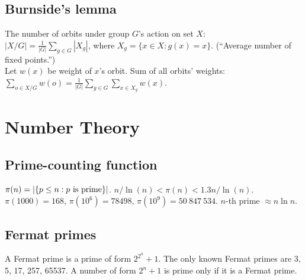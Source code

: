 \documentclass[12pt]{extarticle}
\begin{document}
\begin{multicols*}{2}
\subsection{Burnside's lemma}
The number of orbits under group $G$'s action on set $X$:\\
$|X/G| = \frac{1}{|G|} \sum_{g \in G} |X_g|$,
where $X_g=\{ x \in X: g(x)=x \}$. (``Average number of fixed points.'') \\
Let $w(x)$ be weight of $x$'s orbit. Sum of all orbits' weights:
$\sum_{o \in X/G} w(o) = \frac{1}{|G|} \sum_{g \in G} \sum_{x \in X_g} w(x)$.




\section{Number Theory}


\subsection{Prime-counting function} $\pi(n) = |\{p \le n : p \hbox{ is prime}\}|$.
$n/\ln(n) < \pi(n) < 1.3 n/\ln(n)$.
$\pi(1000) = 168$, $\pi(10^6) = 78498$, $\pi(10^9) = 50\ 847\ 534$.
\quad $n$-th prime $\approx n \ln n$.

\subsection{Fermat primes}  A Fermat prime is a prime of form $2^{2^n}+1$.
The only known Fermat primes are 3, 5, 17, 257, 65537.
A number of form $2^n+1$ is prime only if it is a Fermat prime.



\end{multicols*}
\end{document}
